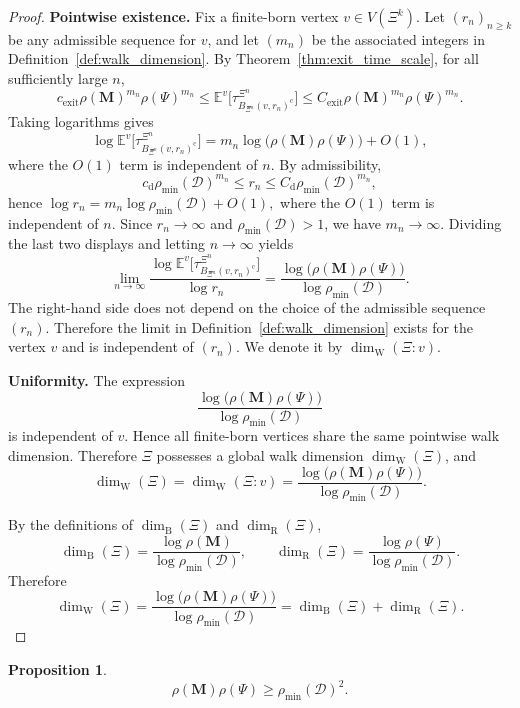 \documentclass{article}
\theoremstyle{plain}
\theoremstyle{definition}
\newtheorem{proposition}[theorem]{Proposition}
\newcommand{\dist}{\mathrm{d}}
\newcommand{\dimbox}{\dim_\mathrm{B}}
\newcommand{\dimwalk}{\dim_\mathrm{W}}
\newcommand{\dimresis}{\dim_\mathrm{R}}
\begin{document}
\begin{proof}
\textbf{Pointwise existence.}
Fix a finite-born vertex $v\in V(\Xi^k)$.
Let $(r_n)_{n\ge k}$ be any admissible sequence for $v$, and let $(m_n)$ be the associated integers in Definition~\ref{def:walk_dimension}.
By Theorem~\ref{thm:exit_time_scale}, for all sufficiently large $n$,
\[
c_{\mathrm{exit}}\rho(\mathbf M)^{m_n}\rho(\Psi)^{m_n}
\le
\mathbb E^v\big[\tau_{B_{\Xi^n}(v,r_n)^{\mathrm c}}^{\Xi^n}\big]
\le
C_{\mathrm{exit}}\rho(\mathbf M)^{m_n}\rho(\Psi)^{m_n}.
\]
Taking logarithms gives
\[
\log \mathbb E^v\big[\tau_{B_{\Xi^n}(v,r_n)^{\mathrm c}}^{\Xi^n}\big]
=
m_n\log\big(\rho(\mathbf M)\rho(\Psi)\big)+O(1),
\]
where the $O(1)$ term is independent of $n$.
By admissibility,
\[
c_{\dist}\rho_{\min}(\mathcal D)^{m_n}\le r_n\le C_{\dist}\rho_{\min}(\mathcal D)^{m_n},
\]
hence
$
\log r_n
=
m_n\log\rho_{\min}(\mathcal D)+O(1),
$
where the $O(1)$ term is independent of $n$.
Since $r_n\to\infty$ and $\rho_{\min}(\mathcal D)>1$, we have $m_n\to\infty$.
Dividing the last two displays and letting $n\to\infty$ yields
\[
\lim_{n\to\infty}
\frac{\log \mathbb E^v\big[\tau_{B_{\Xi^n}(v,r_n)^{\mathrm c}}^{\Xi^n}\big]}{\log r_n}
=
\frac{\log\big(\rho(\mathbf M)\rho(\Psi)\big)}{\log\rho_{\min}(\mathcal D)}.
\]
The right-hand side does not depend on the choice of the admissible sequence $(r_n)$.
Therefore the limit in Definition~\ref{def:walk_dimension} exists for the vertex $v$ and is independent of $(r_n)$.
We denote it by $\dimwalk(\Xi:v)$.

\textbf{Uniformity.}
The expression
\[
\frac{\log\big(\rho(\mathbf M)\rho(\Psi)\big)}{\log\rho_{\min}(\mathcal D)}
\]
is independent of $v$.
Hence all finite-born vertices share the same pointwise walk dimension.
Therefore $\Xi$ possesses a global walk dimension $\dimwalk(\Xi)$, and
\[
\dimwalk(\Xi)
=
\dimwalk(\Xi:v)
=
\frac{\log\big(\rho(\mathbf M)\rho(\Psi)\big)}{\log\rho_{\min}(\mathcal D)}.
\]

By the definitions of $\dimbox(\Xi)$ and $\dimresis(\Xi)$,
\[
\dimbox(\Xi)=\frac{\log\rho(\mathbf M)}{\log\rho_{\min}(\mathcal D)},
\qquad
\dimresis(\Xi)=\frac{\log\rho(\Psi)}{\log\rho_{\min}(\mathcal D)}.
\]
Therefore
\[
\dimwalk(\Xi)
=
\frac{\log\big(\rho(\mathbf M)\rho(\Psi)\big)}{\log\rho_{\min}(\mathcal D)}
=
\dimbox(\Xi)+\dimresis(\Xi).
\]
\end{proof}

\begin{proposition}\label{prop:MPsiD}
\[
\rho(\mathbf M)\rho(\Psi)\ge \rho_{\min}(\mathcal D)^2.
\]
\end{proposition}
\end{document}
